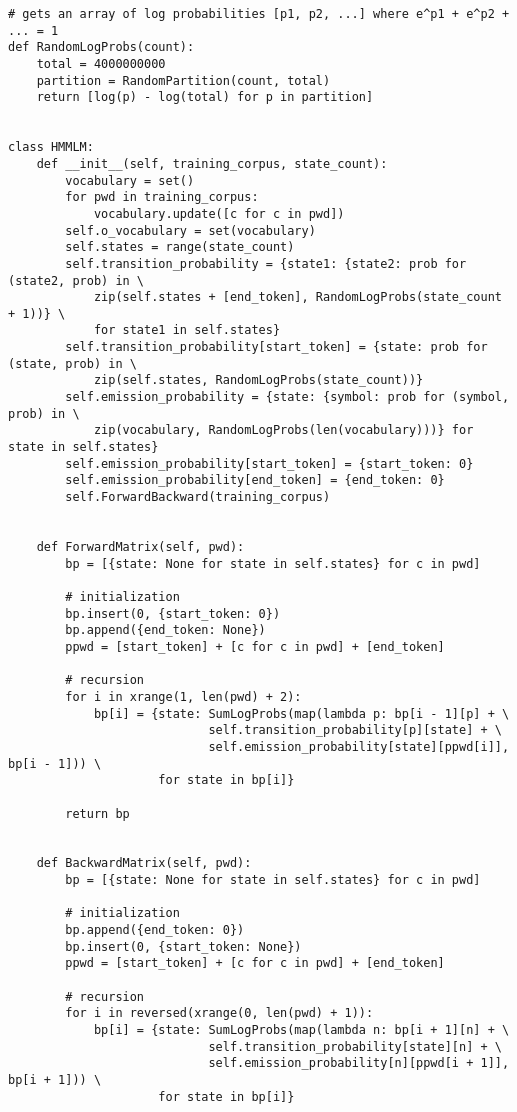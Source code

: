 \documentclass{amsart}
\theoremstyle{definition}
\theoremstyle{remark}
\numberwithin{equation}{section}
\begin{document}
\begin{lstlisting}
# gets an array of log probabilities [p1, p2, ...] where e^p1 + e^p2 + ... = 1
def RandomLogProbs(count):
    total = 4000000000
    partition = RandomPartition(count, total)
    return [log(p) - log(total) for p in partition]


class HMMLM:
    def __init__(self, training_corpus, state_count):
        vocabulary = set()
        for pwd in training_corpus:
            vocabulary.update([c for c in pwd])
        self.o_vocabulary = set(vocabulary)
        self.states = range(state_count)
        self.transition_probability = {state1: {state2: prob for (state2, prob) in \
            zip(self.states + [end_token], RandomLogProbs(state_count + 1))} \
            for state1 in self.states}
        self.transition_probability[start_token] = {state: prob for (state, prob) in \
            zip(self.states, RandomLogProbs(state_count))}
        self.emission_probability = {state: {symbol: prob for (symbol, prob) in \
            zip(vocabulary, RandomLogProbs(len(vocabulary)))} for state in self.states}
        self.emission_probability[start_token] = {start_token: 0}
        self.emission_probability[end_token] = {end_token: 0}
        self.ForwardBackward(training_corpus)


    def ForwardMatrix(self, pwd):
        bp = [{state: None for state in self.states} for c in pwd]

        # initialization
        bp.insert(0, {start_token: 0})
        bp.append({end_token: None})
        ppwd = [start_token] + [c for c in pwd] + [end_token]

        # recursion
        for i in xrange(1, len(pwd) + 2):
            bp[i] = {state: SumLogProbs(map(lambda p: bp[i - 1][p] + \
                            self.transition_probability[p][state] + \
                            self.emission_probability[state][ppwd[i]], bp[i - 1])) \
                     for state in bp[i]}

        return bp
        

    def BackwardMatrix(self, pwd):
        bp = [{state: None for state in self.states} for c in pwd]

        # initialization
        bp.append({end_token: 0})
        bp.insert(0, {start_token: None})
        ppwd = [start_token] + [c for c in pwd] + [end_token]

        # recursion
        for i in reversed(xrange(0, len(pwd) + 1)):
            bp[i] = {state: SumLogProbs(map(lambda n: bp[i + 1][n] + \
                            self.transition_probability[state][n] + \
                            self.emission_probability[n][ppwd[i + 1]], bp[i + 1])) \
                     for state in bp[i]}


\end{lstlisting}
\end{document}
